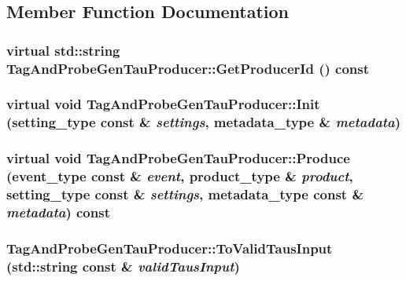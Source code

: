 \subsection{Member Function Documentation}
\hypertarget{classTagAndProbeGenTauProducer_a4239217a44949b55ef50e7934d8815ec}{
\subsubsection[{GetProducerId}]{\setlength{\rightskip}{0pt plus 5cm}virtual std::string TagAndProbeGenTauProducer::GetProducerId () const}}
\label{classTagAndProbeGenTauProducer_a4239217a44949b55ef50e7934d8815ec}
\hypertarget{classTagAndProbeGenTauProducer_a169bc17afdc619c9c59444736453735c}{
\subsubsection[{Init}]{\setlength{\rightskip}{0pt plus 5cm}virtual void TagAndProbeGenTauProducer::Init (setting\_\-type const \& {\em settings}, \/  metadata\_\-type \& {\em metadata})}}
\label{classTagAndProbeGenTauProducer_a169bc17afdc619c9c59444736453735c}
\hypertarget{classTagAndProbeGenTauProducer_a6e4ea2e9ca481194b22bd06c34815d92}{
\subsubsection[{Produce}]{\setlength{\rightskip}{0pt plus 5cm}virtual void TagAndProbeGenTauProducer::Produce (event\_\-type const \& {\em event}, \/  product\_\-type \& {\em product}, \/  setting\_\-type const \& {\em settings}, \/  metadata\_\-type const \& {\em metadata}) const}}
\label{classTagAndProbeGenTauProducer_a6e4ea2e9ca481194b22bd06c34815d92}
\hypertarget{classTagAndProbeGenTauProducer_a9f5580083fbd5b20c323d81ac125dec0}{
\subsubsection[{ToValidTausInput}]{ TagAndProbeGenTauProducer::ToValidTausInput (std::string const \& {\em validTausInput})}}
\label{classTagAndProbeGenTauProducer_a9f5580083fbd5b20c323d81ac125dec0}


